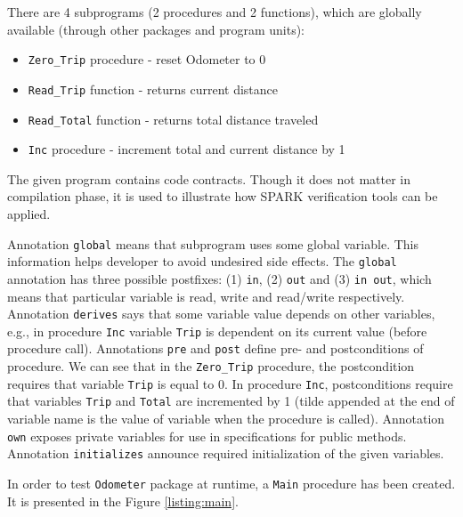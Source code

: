 There are 4 subprograms (2 procedures and 2 functions), which are globally available (through other packages and program units):
\begin{itemize} %
    \item \lstinline{Zero_Trip} procedure - reset Odometer to 0
    \item \lstinline{Read_Trip} function - returns current distance
    \item \lstinline{Read_Total} function - returns total distance traveled
    \item \lstinline{Inc} procedure - increment total and current distance by 1
\end{itemize}

The given program contains code contracts. Though it does not matter in compilation phase, it is used to illustrate how SPARK verification tools can be applied. 

Annotation \lstinline{global} means that subprogram uses some global variable. This information helps developer to avoid undesired side effects. The \lstinline{global} annotation has three possible postfixes: (1) \lstinline{in}, (2) \lstinline{out} and (3) \lstinline{in out}, which means that particular variable is read, write and read/write respectively. Annotation \lstinline{derives} says that some variable value depends on other variables, e.g., in procedure \lstinline{Inc} variable \lstinline{Trip} is dependent on its current value (before procedure call). Annotations \lstinline{pre} and \lstinline{post} define pre- and postconditions of procedure. We can see that in the \lstinline{Zero_Trip} procedure, the postcondition requires that variable \lstinline{Trip} is equal to 0. In procedure \lstinline{Inc}, postconditions require that variables \lstinline{Trip} and \lstinline{Total} are incremented by 1 (tilde appended at the end of variable name is the value of variable when the procedure is called). Annotation \lstinline{own} exposes private variables for use in specifications for public methods. Annotation \lstinline{initializes} announce required initialization of the given variables. 

In order to test \lstinline{Odometer} package at runtime, a \lstinline{Main} procedure has been created. It is presented in the Figure \ref{listing:main}.

